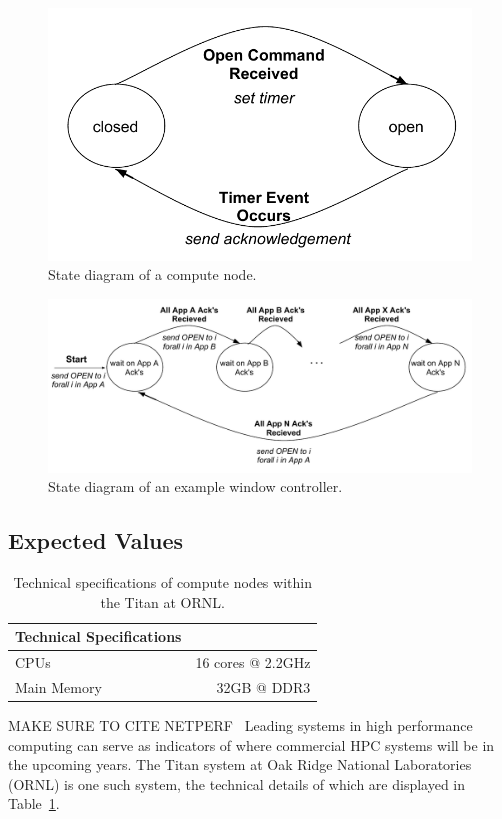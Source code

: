 \documentclass[oneside,12pt]{memoir}
\begin{document}
\begin{figure}
\centering
\includegraphics[scale=0.7]{node_state_diagram.pdf}
\caption{State diagram of a compute node.}
\label{fig:node_state_diagram}
\end{figure}

\begin{figure}
\centering
\includegraphics[scale=0.62]{control_state_diagram.pdf}
\caption{State diagram of an example window controller.}
\label{fig:control_state_diagram}
\end{figure}
\subsection{Expected Values}

\begin{table}
	\begin{center}
	    \begin{tabular}{  l | r  }
	    Technical Specifications & \\ \hline
	    CPUs & 16 cores @ 2.2GHz \\
	    Main Memory & 32GB @ DDR3\\
	    \end{tabular}
	\end{center}
	\caption{Technical specifications of compute nodes within the Titan at ORNL.}
	\label{tab:titan_ORNL}
\end{table}
MAKE SURE TO CITE NETPERF~\cite{netperf}
Leading systems in high performance computing can serve as indicators of where commercial HPC systems will be in the upcoming years. The Titan system at Oak Ridge National Laboratories (ORNL) is one such system, the technical details of which are displayed in Table~\ref{tab:titan_ORNL}.
\end{document}

